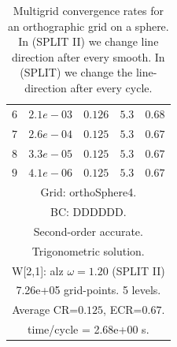 \begin{table}[hbt]
\begin{center}
{\begin{tabular}{|c|c|c|c|c|}
 $ 6$  & $ 2.1e-03$ & $0.126$ & $ 5.3$ & $0.68$ \\ 
 $ 7$  & $ 2.6e-04$ & $0.125$ & $ 5.3$ & $0.67$ \\ 
 $ 8$  & $ 3.3e-05$ & $0.125$ & $ 5.3$ & $0.67$ \\ 
 $ 9$  & $ 4.1e-06$ & $0.125$ & $ 5.3$ & $0.67$ \\ 
\hline 
\multicolumn{5}{|c|}{Grid: orthoSphere4.}  \\
\multicolumn{5}{|c|}{BC: DDDDDD.}  \\
\multicolumn{5}{|c|}{Second-order accurate.}  \\
\multicolumn{5}{|c|}{Trigonometric solution.}  \\
\multicolumn{5}{|c|}{W[2,1]: alz $\omega=1.20$ (SPLIT II)}  \\
\multicolumn{5}{|c|}{7.26e+05 grid-points. 5 levels.}  \\
\multicolumn{5}{|c|}{Average CR=$0.125$, ECR=$0.67$.}  \\
\multicolumn{5}{|c|}{time/cycle = 2.68e+00 s.}  \\
\hline 
\end{tabular}
} %
\end{center}
\caption{Multigrid convergence rates for an orthographic grid on a sphere. In (SPLIT II) we change line direction after every smooth.
In (SPLIT) we change the line-direction after every cycle. }
\label{fig:cylinder}
\end{table}

